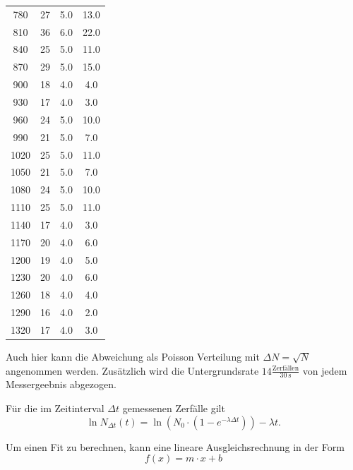 \begin{table}
\begin{tabular}{c c c c}
		 780   	&       27  	&  5.0 &       13.0 \\
		 810   	&       36  	&  6.0 &       22.0 \\
		 840   	&       25  	&  5.0 &       11.0 \\
		 870   	&       29  	&  5.0 &       15.0 \\
		 900   	&       18  	&  4.0 &        4.0 \\
		 930   	&       17  	&  4.0 &        3.0 \\
		 960   	&       24  	&  5.0 &       10.0 \\
		 990   	&       21  	&  5.0 &        7.0 \\
		1020   	&       25  	&  5.0 &       11.0 \\
		1050   	&       21  	&  5.0 &        7.0 \\
		1080   	&       24  	&  5.0 &       10.0 \\
		1110   	&       25  	&  5.0 &       11.0 \\
		1140   	&       17  	&  4.0 &        3.0 \\
		1170   	&       20  	&  4.0 &        6.0 \\
		1200   	&       19  	&  4.0 &        5.0 \\
		1230   	&       20  	&  4.0 &        6.0 \\
		1260   	&       18  	&  4.0 &        4.0 \\
		1290   	&       16  	&  4.0 &        2.0 \\
		1320   	&       17  	&  4.0 &        3.0 \\
\bottomrule
	\end{tabular}
\end{table}
\noindent
Auch hier kann die Abweichung als Poisson Verteilung mit $\Delta N = \sqrt{N}$ angenommen werden. Zusätzlich wird die Untergrundsrate $14 \frac{\text{Zerfällen}}{\SI{30}{\second}}$ von jedem Messergeebnis abgezogen.

Für die im Zeitinterval $\Delta t$ gemessenen Zerfälle gilt
\begin{equation}
	\ln N_{\Delta t}(t) = \ln\left( N_0 \cdot \left(1 - e^{-\lambda \Delta t}\right) \right) - \lambda t.
	\label{eqn:logarithmisch}
\end{equation}
\noindent

Um einen Fit zu berechnen, kann eine lineare Ausgleichsrechnung in der Form
\begin{equation*}
	f(x) = m \cdot x + b
	\label{eqn:mx+b}
\end{equation*}
\noindent

